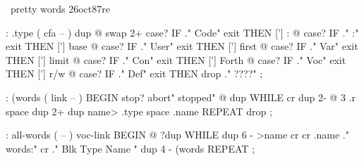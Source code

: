                                          
                                        
\ pretty words                 26oct87re 
                                         
: .type  ( cfa -- )   dup @ swap 2+      
             case? IF ." Code" exit THEN 
 ['] :     @ case? IF ."    :" exit THEN 
 ['] base  @ case? IF ." User" exit THEN 
 ['] first @ case? IF ."  Var" exit THEN 
 ['] limit @ case? IF ."  Con" exit THEN 
 ['] Forth @ case? IF ."  Voc" exit THEN 
 ['] r/w   @ case? IF ."  Def" exit THEN 
 drop ." ????" ;                         
                                         
: (words  ( link -- )                    
 BEGIN  stop? abort" stopped"  @ dup     
 WHILE  cr dup 2- @ 3 .r space           
        dup 2+  dup name> .type space    
        .name  REPEAT drop ;             
                                         
: all-words ( -- )                       
 voc-link                                
 BEGIN  @ ?dup                           
 WHILE  dup 6 - >name                    
        cr cr .name ."  words:" cr       
        ." Blk Type Name "               
        dup 4 - (words  REPEAT ;        
                                         
                                         
                                         
                                         
                                         
                                         
                                         
                                         
                                         
                                         
                                         
                                         
                                         
                                         
                                         
                                         
                                         
                                         
                                         
                                         
                                         
